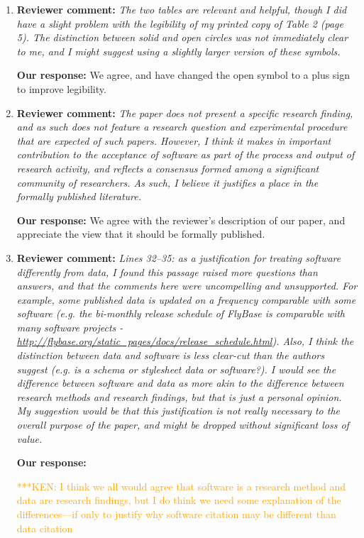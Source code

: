 \documentclass{article}
\newcommand{\niemnote}[1]{ {\textcolor{orange} { ***KEN: #1 }}} %
\begin{document}
\begin{enumerate}

\item \textbf{Reviewer comment:}
\emph{The two tables are relevant and helpful, though I did have a slight problem with the legibility of my printed copy of Table 2 (page 5). The distinction between solid and open circles was not immediately clear to me, and I might suggest using a slightly larger version of these symbols.}

\textbf{Our response:}
We agree, and have changed the open symbol to a plus sign to improve legibility.


\item \textbf{Reviewer comment:}
\emph{The paper does not present a specific research finding, and as such does not feature a research question and experimental procedure that are expected of such papers. However, I think it makes in important contribution to the acceptance of software as part of the process and output of research activity, and reflects a consensus formed among a significant community of researchers. As such, I believe it justifies a place in the formally published literature.}

\textbf{Our response:}
We agree with the reviewer's description of our paper, and appreciate the view that it should be formally published.


\item \textbf{Reviewer comment:}
\emph{Lines 32--35: as a justification for treating software differently from data, I found this passage raised more questions than answers, and that the comments here were uncompelling and unsupported. For example, some published data is updated on a frequency comparable with some software (e.g. the bi-monthly release schedule of FlyBase is comparable with many software projects - \url{http://flybase.org/static_pages/docs/release_schedule.html}). Also, I think the distinction between data and software is less clear-cut than the authors suggest (e.g. is a schema or stylesheet data or software?). I would see the difference between software and data as more akin to the difference between research methods and research findings, but that is just a personal opinion. My suggestion would be that this justification is not really necessary to the overall purpose of the paper, and might be dropped without significant loss of value.}

\textbf{Our response:}

\niemnote{I think we all would agree that software is a research method and data are research findings, but I do think we need some explanation of the differences---if only to justify why software citation may be different than data citation}


\end{enumerate}
\end{document}
